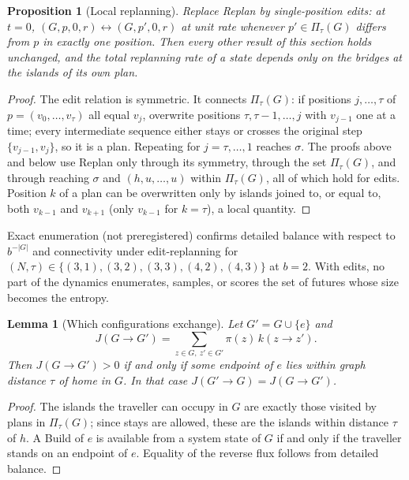 \documentclass[aps,pre,preprint,superscriptaddress,nofootinbib]{revtex4-2}
\newtheorem{lemma}{Lemma}
\newtheorem{proposition}{Proposition}
\theoremstyle{definition}
\theoremstyle{remark}
\newcommand{\Pl}{\Pi_\tau}
\begin{document}
\begin{proposition}[Local replanning]
\label{prop:local}
Replace Replan by single-position edits: at $t=0$, $(G,p,0,r)\leftrightarrow(G,p',0,r)$ at unit rate whenever $p'\in\Pl(G)$ differs from $p$ in exactly one position. Then every other result of this section holds unchanged, and the total replanning rate of a state depends only on the bridges at the islands of its own plan.
\end{proposition}
\begin{proof}
The edit relation is symmetric. It connects $\Pl(G)$: if positions $j,\dots,\tau$ of $p=(v_0,\dots,v_\tau)$ all equal $v_j$, overwrite positions $\tau,\tau-1,\dots,j$ with $v_{j-1}$ one at a time; every intermediate sequence either stays or crosses the original step $\{v_{j-1},v_j\}$, so it is a plan. Repeating for $j=\tau,\dots,1$ reaches $\sigma$. The proofs above and below use Replan only through its symmetry, through the set $\Pl(G)$, and through reaching $\sigma$ and $(h,u,\dots,u)$ within $\Pl(G)$, all of which hold for edits. Position $k$ of a plan can be overwritten only by islands joined to, or equal to, both $v_{k-1}$ and $v_{k+1}$ (only $v_{k-1}$ for $k=\tau$), a local quantity.
\end{proof}

Exact enumeration (not preregistered) confirms detailed balance with respect to $b^{-|G|}$ and connectivity under edit-replanning for $(N,\tau)\in\{(3,1),(3,2),(3,3),(4,2),(4,3)\}$ at $b=2$. With edits, no part of the dynamics enumerates, samples, or scores the set of futures whose size becomes the entropy.

\begin{lemma}[Which configurations exchange]
\label{lem:flux}
Let $G'=G\cup\{e\}$ and
\begin{equation*}
  J(G\to G')=\sum_{z\in G,\ z'\in G'}\pi(z)\,k(z\to z').
\end{equation*}
Then $J(G\to G')>0$ if and only if some endpoint of $e$ lies within graph distance $\tau$ of home in $G$. In that case $J(G'\to G)=J(G\to G')$.
\end{lemma}
\begin{proof}
The islands the traveller can occupy in $G$ are exactly those visited by plans in $\Pl(G)$; since stays are allowed, these are the islands within distance $\tau$ of $h$. A Build of $e$ is available from a system state of $G$ if and only if the traveller stands on an endpoint of $e$. Equality of the reverse flux follows from detailed balance.
\end{proof}
\end{document}
